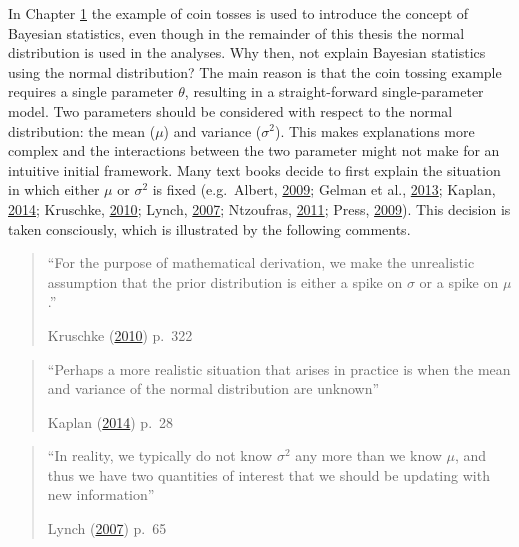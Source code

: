 \documentclass[openright,titlepage,12pt,a4paper]{book}
\begin{document}
In Chapter \protect\hyperlink{introduction}{1} the example of coin tosses is used to introduce the concept of Bayesian statistics, even though in the remainder of this thesis the normal distribution is used in the analyses. Why then, not explain Bayesian statistics using the normal distribution? The main reason is that the coin tossing example requires a single parameter \(\theta\), resulting in a straight-forward single-parameter model. Two parameters should be considered with respect to the normal distribution: the mean (\(\mu\)) and variance (\(\sigma^2\)). This makes explanations more complex and the interactions between the two parameter might not make for an intuitive initial framework. Many text books decide to first explain the situation in which either \(\mu\) or \(\sigma^2\) is fixed (e.g.~Albert, \protect\hyperlink{ref-albert_bayesian_2009}{2009}; Gelman et al., \protect\hyperlink{ref-gelman_bayesian_2013}{2013}; Kaplan, \protect\hyperlink{ref-kaplan_bayesian_2014}{2014}; Kruschke, \protect\hyperlink{ref-kruschke_doing_2010}{2010}; Lynch, \protect\hyperlink{ref-lynch_introduction_2007}{2007}; Ntzoufras, \protect\hyperlink{ref-ntzoufras_bayesian_2011}{2011}; Press, \protect\hyperlink{ref-press_subjective_2009}{2009}). This decision is taken consciously, which is illustrated by the following comments.

\begin{quote}
``For the purpose of mathematical derivation, we make the unrealistic assumption
that the prior distribution is either a spike on \(\sigma\) or a spike on \(\mu\).''

Kruschke (\protect\hyperlink{ref-kruschke_doing_2010}{2010}) p.~322
\end{quote}

\begin{quote}
``Perhaps a more realistic situation that arises in practice is when the
mean and variance of the normal distribution are unknown''

Kaplan (\protect\hyperlink{ref-kaplan_bayesian_2014}{2014}) p.~28
\end{quote}

\newpage

\begin{quote}
``In reality, we typically do not know \(\sigma^2\) any more than we know \(\mu\),
and thus we have two quantities of interest that we should be updating with
new information''

Lynch (\protect\hyperlink{ref-lynch_introduction_2007}{2007}) p.~65
\end{quote}
\end{document}
